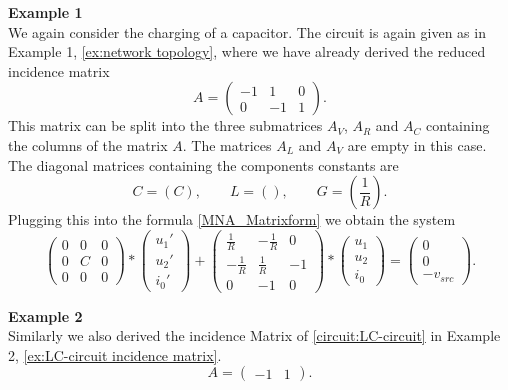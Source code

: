 \textbf{Example 1} \label{ex:MNA} \\
We again consider the charging of a capacitor. The circuit is again given as in Example 1, \ref{ex:network topology}, where we have already derived the reduced incidence matrix
\begin{displaymath}
	A = 
	\left(
	\begin{matrix}
		-1 & 1 & 0 \\
		0 & -1 & 1 
	\end{matrix}
	\right).
\end{displaymath} 
 This matrix can be split into the three submatrices $A_V$, $A_R$ and $A_C$ containing the columns of the matrix $A$. The matrices $A_L$ and $A_V$ are empty in this case. The diagonal matrices containing the components constants are
 \begin{displaymath}
 	C = (C), \qquad L = (), \qquad G = (\frac{1}{R}).
 \end{displaymath}
Plugging this into the formula \eqref{MNA_Matrixform} we obtain the system
\begin{displaymath}
	\begin{pmatrix}
		0 & 0 & 0 \\
		0 & C & 0 \\
		0 & 0 & 0
	\end{pmatrix}
	*
	\begin{pmatrix}
		u_1' \\
		u_2' \\
		i_0'
	\end{pmatrix}
	+
	\begin{pmatrix}
		\frac{1}{R} & -\frac{1}{R} & 0 \\
		-\frac{1}{R} & \frac{1}{R} & -1 \\
		0 & -1 & 0 
	\end{pmatrix}
	*
	\begin{pmatrix}
		u_1 \\
		u_2 \\
		i_0
	\end{pmatrix}
	=
	\begin{pmatrix}
		0 \\
		0 \\
		-v_{src}
	\end{pmatrix}.
\end{displaymath}

\textbf{Example 2} \label{ex:LC-circuit MNA} \\
Similarly we also derived the incidence Matrix of \ref{circuit:LC-circuit} in Example 2, \eqref{ex:LC-circuit incidence matrix}.
\begin{displaymath}
	A = 
	\left(
	\begin{matrix}
		-1 & 1  
	\end{matrix}
	\right).
\end{displaymath}

